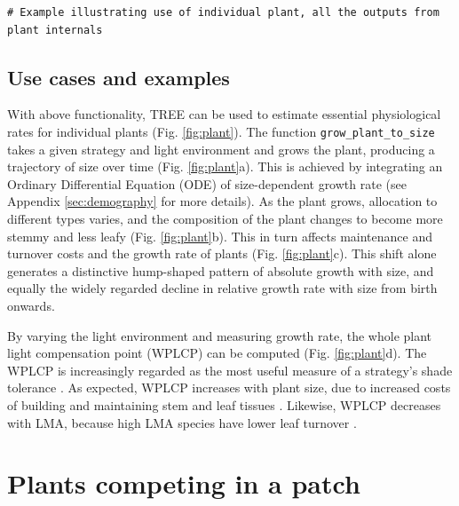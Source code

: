 \documentclass[]{article}
\begin{document}
\begin{verbatim}
# Example illustrating use of individual plant, all the outputs from plant internals
\end{verbatim}

\subsection{Use cases and examples}\label{use-cases-and-examples}


With above functionality, TREE can be used to estimate essential
physiological rates for individual plants (Fig. \ref{fig:plant}). The
function \texttt{grow\_plant\_to\_size} takes a given strategy and light
environment and grows the plant, producing a trajectory of size over
time (Fig. \ref{fig:plant}a). This is achieved by integrating an
Ordinary Differential Equation (ODE) of size-dependent growth rate (see
Appendix \ref{sec:demography} for more
details). As the plant grows, allocation to different types varies, and
the composition of the plant changes to become more stemmy and less
leafy (Fig. \ref{fig:plant}b). This in turn affects maintenance and
turnover costs and the growth rate of plants (Fig. \ref{fig:plant}c).
This shift alone generates a distinctive hump-shaped pattern of absolute
growth with size, and equally the widely regarded decline in relative
growth rate with size from birth onwards.

By varying the light environment and measuring growth rate, the whole
plant light compensation point (WPLCP) can be computed (Fig.
\ref{fig:plant}d). The WPLCP is increasingly regarded as the most useful
measure of a strategy's shade tolerance
\citep{Givnish-1988, Baltzer-2007, Lusk-2013}. As expected, WPLCP
increases with plant size, due to increased costs of building and
maintaining stem and leaf tissues \citep{Givnish-1988}. Likewise, WPLCP
decreases with LMA, because high LMA species have lower leaf turnover
\citep{Baltzer-2007, Lusk-2013}.

\section{Plants competing in a patch}\label{plants-competing-in-a-patch}
\end{document}
